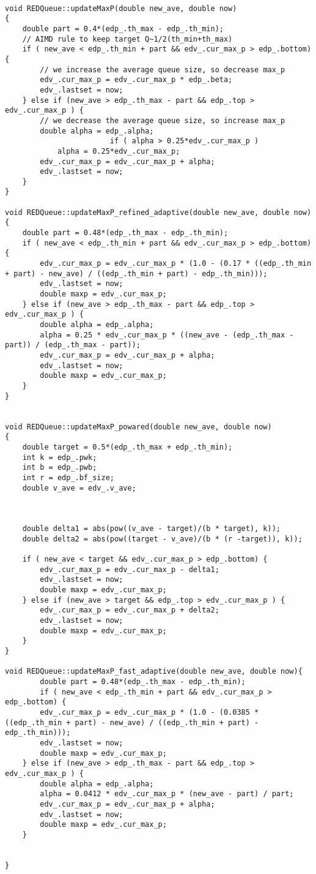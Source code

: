 \begin{verbatim}

void REDQueue::updateMaxP(double new_ave, double now)
{
	double part = 0.4*(edp_.th_max - edp_.th_min);
	// AIMD rule to keep target Q~1/2(th_min+th_max)
	if ( new_ave < edp_.th_min + part && edv_.cur_max_p > edp_.bottom) {
		// we increase the average queue size, so decrease max_p
		edv_.cur_max_p = edv_.cur_max_p * edp_.beta;
		edv_.lastset = now;
	} else if (new_ave > edp_.th_max - part && edp_.top > edv_.cur_max_p ) {
		// we decrease the average queue size, so increase max_p
		double alpha = edp_.alpha;
                        if ( alpha > 0.25*edv_.cur_max_p )
			alpha = 0.25*edv_.cur_max_p;
		edv_.cur_max_p = edv_.cur_max_p + alpha;
		edv_.lastset = now;
	} 
}

void REDQueue::updateMaxP_refined_adaptive(double new_ave, double now)
{
  	double part = 0.48*(edp_.th_max - edp_.th_min);
 	if ( new_ave < edp_.th_min + part && edv_.cur_max_p > edp_.bottom) {
 		edv_.cur_max_p = edv_.cur_max_p * (1.0 - (0.17 * ((edp_.th_min + part) - new_ave) / ((edp_.th_min + part) - edp_.th_min))); 
 		edv_.lastset = now;
 		double maxp = edv_.cur_max_p;
 	} else if (new_ave > edp_.th_max - part && edp_.top > edv_.cur_max_p ) {
 		double alpha = edp_.alpha;
 		alpha = 0.25 * edv_.cur_max_p * ((new_ave - (edp_.th_max - part)) / (edp_.th_max - part));
 		edv_.cur_max_p = edv_.cur_max_p + alpha;
 		edv_.lastset = now;
 		double maxp = edv_.cur_max_p;
 	}
}


void REDQueue::updateMaxP_powared(double new_ave, double now)
{
  	double target = 0.5*(edp_.th_max + edp_.th_min);
  	int k = edp_.pwk;
  	int b = edp_.pwb;
  	int r = edp_.bf_size;
  	double v_ave = edv_.v_ave;
  	
  	
  	
  	double delta1 = abs(pow((v_ave - target)/(b * target), k));
  	double delta2 = abs(pow((target - v_ave)/(b * (r -target)), k));
 	
 	if ( new_ave < target && edv_.cur_max_p > edp_.bottom) {
 		edv_.cur_max_p = edv_.cur_max_p - delta1; 
 		edv_.lastset = now;
 		double maxp = edv_.cur_max_p; 
 	} else if (new_ave > target && edp_.top > edv_.cur_max_p ) {
 		edv_.cur_max_p = edv_.cur_max_p + delta2;
 		edv_.lastset = now;
 		double maxp = edv_.cur_max_p;
 	}
}

void REDQueue::updateMaxP_fast_adaptive(double new_ave, double now){
	  	double part = 0.48*(edp_.th_max - edp_.th_min);
		if ( new_ave < edp_.th_min + part && edv_.cur_max_p > edp_.bottom) {
 		edv_.cur_max_p = edv_.cur_max_p * (1.0 - (0.0385 * ((edp_.th_min + part) - new_ave) / ((edp_.th_min + part) - edp_.th_min))); 
 		edv_.lastset = now;
 		double maxp = edv_.cur_max_p;
 	} else if (new_ave > edp_.th_max - part && edp_.top > edv_.cur_max_p ) {
 		double alpha = edp_.alpha;
 		alpha = 0.0412 * edv_.cur_max_p * (new_ave - part) / part;
 		edv_.cur_max_p = edv_.cur_max_p + alpha;
 		edv_.lastset = now;
 		double maxp = edv_.cur_max_p;
 	}


}

\end{verbatim}

